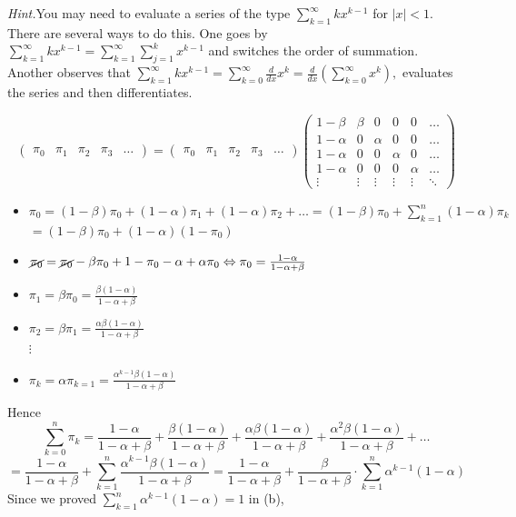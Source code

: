 \documentclass[12pt]{article}
\begin{document}
\begin{enumerate}[label=(\alph*)]
\textit{Hint.}You may need to evaluate a series of the type $\sum_{k=1}^\infty kx^{k-1}$ for $|x| < 1$. There are several ways to do this. One goes by $\sum_{k=1}^\infty kx^{k-1} = \sum_{k=1}^\infty \sum_{j=1}^k x^{k-1}$ and switches the
order of summation. Another observes that $\sum_{k=1}^\infty kx^{k-1} = \sum_{k=0}^\infty \frac{d}{dx} x^k = \frac{d}{dx}(\sum_{k=0}^\infty x^k),$ evaluates the series and then differentiates.

    $$
    \begin{pmatrix}
        \pi_0&\pi_1&\pi_2&\pi_3&\ldots
    \end{pmatrix}
    =
    \begin{pmatrix}
        \pi_0&\pi_1&\pi_2&\pi_3&\ldots
    \end{pmatrix}
    \begin{pmatrix}
        1-\beta&\beta&0&0&0&\ldots\\
        1-\alpha&0&\alpha&0&0&\ldots\\
        1-\alpha&0&0&\alpha&0&\ldots\\
        1-\alpha&0&0&0&\alpha&\ldots\\
        \vdots&\vdots&\vdots&\vdots&\vdots&\ddots
    \end{pmatrix}
    $$
    
    \begin{itemize}
        \item $\pi_0 = (1-\beta)\pi_0 + (1-\alpha)\pi_1 + (1-\alpha)\pi_2 + \ldots
        = (1-\beta)\pi_0 + \sum_{k=1}^n (1-\alpha)\pi_k$\\
        $= (1-\beta)\pi_0 + (1-\alpha)(1-\pi_0)$
        \item $\cancel{\pi_0} = \cancel{\pi_0} -\beta\pi_0 + 1 -\pi_0 -\alpha +\alpha\pi_0
        \Leftrightarrow \pi_0 = \frac{1-\alpha}{1-\alpha +\beta}$\\
        
        \item $\pi_1 = \beta\pi_0 = \frac{\beta(1-\alpha)}{1-\alpha + \beta}$
        \item $\pi_2 = \beta\pi_1 = \frac{\alpha\beta(1-\alpha)}{1-\alpha+\beta}$\\
        $\vdots$
        \item $\pi_k = \alpha\pi_{k=1} = \frac{\alpha^{k-1}\beta(1-\alpha)}{1-\alpha+\beta}$
    \end{itemize}
    
    Hence
    $$
    \sum_{k=0}^n \pi_k  
    =\frac{1-\alpha}{1-\alpha +\beta} +\frac{\beta(1-\alpha)}{1-\alpha + \beta}
    +\frac{\alpha\beta(1-\alpha)}{1-\alpha+\beta}
    +\frac{\alpha^2\beta(1-\alpha)}{1-\alpha+\beta}
    +\ldots
    $$
    $$
    = \frac{1-\alpha}{1-\alpha +\beta} 
    + \sum_{k=1}^n \frac{\alpha^{k-1}\beta(1-\alpha)}{1-\alpha+\beta}
    = \frac{1-\alpha}{1-\alpha +\beta} 
    + \frac{\beta}{1-\alpha+\beta}\cdot \sum_{k=1}^n \alpha^{k-1}(1-\alpha)
    $$
    Since we proved $\sum_{k=1}^n \alpha^{k-1}(1-\alpha) = 1$ in (b),
    

\end{enumerate}
\end{document}
